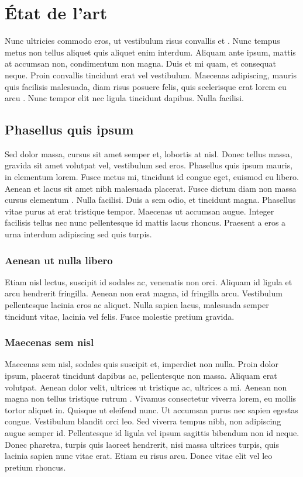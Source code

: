 \chapter[État de l'art]{État de l'art}
\minitoc

Nunc ultricies commodo eros, ut vestibulum risus convallis et \cite{ALE97}. Nunc tempus metus non tellus aliquet quis aliquet enim interdum. Aliquam ante ipsum, mattis at accumsan non, condimentum non magna. Duis et mi quam, et consequat neque. Proin convallis \parencite{BRE03,CHA03} tincidunt erat vel vestibulum. Maecenas adipiscing, mauris quis facilisis malesuada, diam risus posuere felis, quis scelerisque erat lorem eu arcu \parencite[voir][page 12]{BRE03}. Nunc tempor elit nec ligula tincidunt dapibus. Nulla facilisi. 

\section{Phasellus quis ipsum}

Sed dolor massa, cursus sit amet semper et, lobortis at nisl. Donec tellus massa, gravida \cite{SHE04} sit amet volutpat vel, vestibulum sed eros. Phasellus quis ipsum mauris, in elementum lorem. Fusce metus mi, tincidunt id congue eget, euismod eu libero. Aenean et lacus sit amet nibh malesuada placerat. Fusce dictum diam non massa cursus elementum \cite{ARB98}. Nulla facilisi. Duis a sem odio, et tincidunt magna. Phasellus vitae purus at erat tristique tempor. Maecenas ut accumsan augue. Integer facilisis tellus nec nunc pellentesque id mattis lacus rhoncus. Praesent a eros a urna interdum adipiscing sed quis turpis. 

\subsection{Aenean ut nulla libero}

Etiam nisl lectus, suscipit id sodales ac, venenatis non orci. Aliquam id ligula et arcu hendrerit fringilla. Aenean non erat magna, id fringilla arcu. Vestibulum pellentesque lacinia eros ac aliquet. Nulla sapien lacus, malesuada semper tincidunt vitae, lacinia vel felis. Fusce molestie pretium gravida. 

\subsection{Maecenas sem nisl}

Maecenas sem nisl, sodales quis suscipit et, imperdiet non nulla. Proin dolor ipsum, placerat tincidunt dapibus ac, pellentesque non massa. Aliquam erat volutpat. Aenean dolor velit, ultrices ut tristique ac, ultrices a mi. Aenean non magna non tellus tristique rutrum \cite{FOL98}. Vivamus consectetur viverra lorem, eu mollis tortor aliquet in. Quisque ut eleifend nunc. Ut accumsan purus nec sapien egestas congue. Vestibulum blandit orci leo. Sed viverra tempus nibh, non adipiscing augue semper id. Pellentesque id ligula vel ipsum sagittis bibendum non id neque. Donec pharetra, turpis quis laoreet hendrerit, nisi massa ultrices turpis, quis lacinia sapien nunc vitae erat. Etiam eu risus arcu. Donec vitae elit vel leo pretium rhoncus. 

